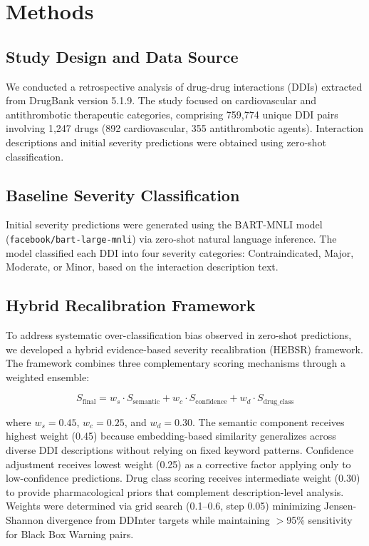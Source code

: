 \documentclass[11pt,a4paper]{article}
\begin{document}
\section*{Methods}

\subsection*{Study Design and Data Source}

We conducted a retrospective analysis of drug-drug interactions (DDIs) extracted from DrugBank version 5.1.9. The study focused on cardiovascular and antithrombotic therapeutic categories, comprising 759,774 unique DDI pairs involving 1,247 drugs (892 cardiovascular, 355 antithrombotic agents). Interaction descriptions and initial severity predictions were obtained using zero-shot classification.

\subsection*{Baseline Severity Classification}

Initial severity predictions were generated using the BART-MNLI model (\texttt{facebook/bart-large-mnli}) via zero-shot natural language inference. The model classified each DDI into four severity categories: Contraindicated, Major, Moderate, or Minor, based on the interaction description text.

\subsection*{Hybrid Recalibration Framework}

To address systematic over-classification bias observed in zero-shot predictions, we developed a hybrid evidence-based severity recalibration (HEBSR) framework. The framework combines three complementary scoring mechanisms through a weighted ensemble:

\begin{equation}
S_{\text{final}} = w_s \cdot S_{\text{semantic}} + w_c \cdot S_{\text{confidence}} + w_d \cdot S_{\text{drug\_class}}
\label{eq:hybrid}
\end{equation}

where $w_s = 0.45$, $w_c = 0.25$, and $w_d = 0.30$. The semantic component receives highest weight (0.45) because embedding-based similarity generalizes across diverse DDI descriptions without relying on fixed keyword patterns. Confidence adjustment receives lowest weight (0.25) as a corrective factor applying only to low-confidence predictions. Drug class scoring receives intermediate weight (0.30) to provide pharmacological priors that complement description-level analysis. Weights were determined via grid search (0.1--0.6, step 0.05) minimizing Jensen-Shannon divergence from DDInter targets while maintaining $>$95\% sensitivity for Black Box Warning pairs.
\end{document}

